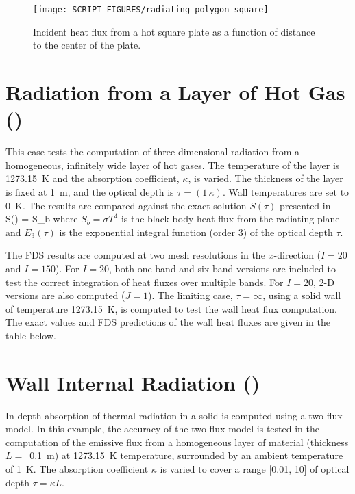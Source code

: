 \documentclass[11pt]{book}
\begin{document}
\begin{figure}[ht]
\centering
\texttt{[image: SCRIPT\_FIGURES/radiating\_polygon\_square]}
\caption[The  test case]{Incident heat flux from a hot square plate as a function of distance to the center of the plate.}
\label{radiating_polygon_figure}
\end{figure}



\section{Radiation from a Layer of Hot Gas (\texorpdfstring{}{radiation\_plane\_layer})}
\label{radiation_plane_layer}

This case tests the computation of three-dimensional radiation from a homogeneous, infinitely wide layer of hot gases.  The temperature of
the layer is 1273.15~K and the absorption coefficient, $\kappa$, is varied. The thickness of the layer is fixed at 1~m, and the optical depth is $\tau = (1 \, \kappa)$.
Wall temperatures are set to 0~K. The results are compared against the exact solution $S(\tau)$ presented in~\cite{Zeldovich:1}
\be S(\tau) = S_b \ee
where $S_b = \sigma T^4$ is the black-body heat flux from the radiating plane and $E_3(\tau)$ is the exponential
integral function (order 3) of the optical depth $\tau$.

The FDS results are computed at two mesh resolutions in the $x$-direction ($I=20$ and $I=150$). For $I=20$, both one-band and six-band versions are
included to test the correct integration of heat fluxes over multiple bands. For $I=20$, 2-D versions are also computed ($J=1$). The limiting case, $\tau=\infty$,
using a solid wall of temperature 1273.15~K, is computed to test the wall heat flux computation. The exact values and FDS predictions of
the wall heat fluxes are given in the table below.



\section{Wall Internal Radiation (\texorpdfstring{}{wall\_internal\_radiation}) }
\label{wall_internal_radiation}

In-depth absorption of thermal radiation in a solid is computed using a two-flux model.  In this example, the accuracy of the two-flux model is tested in the computation of the emissive flux from a homogeneous layer of material (thickness $L=$~0.1~m) at 1273.15~K temperature, surrounded by an ambient temperature of 1~K. The absorption coefficient $\kappa$ is varied to cover a range [0.01, 10] of optical depth $\tau = \kappa L$.
\end{document}
